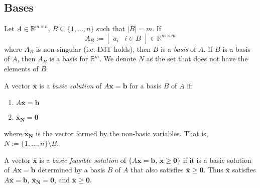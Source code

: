 \subsection{Bases}
\begin{defbox}
    \begin{definition}
        Let $A\in \mathbb{R}^{m\times n}$, $B\subseteq\{1,\dots,n\}$ such that $|B|=m$. If
        \[A_B:= \left[\begin{array}{c|c} a_i & i\in B \end{array}\right]
            \in \mathbb{R}^{m\times m}
        \]
        where $A_B$ is non-singular (i.e. IMT holds), then $B$ is a \emph{basis} of $A$.
        If $B$ is a basis of $A$, then $A_B$ is a basis for $\mathbb{R}^m$. We
        denote $N$ as the set that does not have the elements of $B$.
    \end{definition}
\end{defbox}

\begin{defbox}
    \begin{definition}
        A vector $\bm{\bar{x}}$ is a \emph{basic solution} of $ A \bm{x}=\bm{b} $
        for a basis $ B $ of $ A $ if:
        \begin{enumerate}[(1)]
            \item $A \bm{\bar{x}}=\bm{b}$
            \item $\bm{\bar{x}_N}=\bm{0}$
        \end{enumerate}
        where $ \bm{\bar{x}_N} $ is the vector formed by the non-basic variables.
        That is, $ N:=\{1,\ldots,n\}\setminus B $.
    \end{definition}
\end{defbox}

\begin{defbox}
    \begin{definition}
        A vector $\bm{\bar{x}}$ is a \emph{basic feasible solution} of
        $ \{A \bm{x}=\bm{b},\, \bm{x}\geqslant  \bm{0}\} $ if it is a basic solution
        of $ A\bm{x}=\bm{b}$ determined by a basis $ B $ of $ A $ that also
        satisfies $\bm{\bar{x}}\geqslant  \bm{0}$. Thus $ \bm{\bar{x}} $ satisfies
        $ A \bm{\bar{x}}=\bm{b} $, $ \bm{\bar{x}_N}=\bm{0} $, and $ \bm{\bar{x}}\geqslant  \bm{0} $.
    \end{definition}
\end{defbox}

